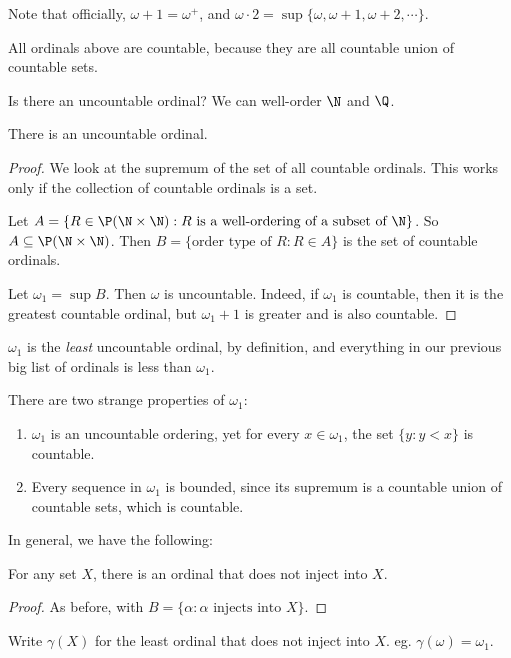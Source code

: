 \documentclass[a4paper]{article}
\begin{document}
Note that officially, $\omega + 1 = \omega^+$, and $\omega \cdot 2= \sup\{\omega, \omega + 1, \omega + 2, \cdots\}$.

All ordinals above are countable, because they are all countable union of countable sets.

Is there an uncountable ordinal? We can well-order $\N$ and $\Q$.

\begin{thm}
  There is an uncountable ordinal.
\end{thm}

\begin{proof}
  We look at the supremum of the set of all countable ordinals. This works only if the collection of countable ordinals is a set.

  Let $A = \{R\in \P(\N\times \N): R \text{ is a well-ordering of a subset of }\N\}$. So $A \subseteq \P(\N\times \N)$. Then $B = \{\text{order type of }R: R\in A\}$ is the set of countable ordinals.
  
  Let $\omega_1 = \sup B$. Then $\omega$ is uncountable. Indeed, if $\omega_1$ is countable, then it is the greatest countable ordinal, but $\omega_1 + 1$ is greater and is also countable.
\end{proof}

\note $\omega_1$ is the \emph{least} uncountable ordinal, by definition, and everything in our previous big list of ordinals is less than $\omega_1$.

There are two strange properties of $\omega_1$:
\begin{enumerate}
  \item $\omega_1$ is an uncountable ordering, yet for every $x\in \omega_1$, the set $\{y: y< x\}$ is countable.
  \item Every sequence in $\omega_1$ is bounded, since its supremum is a countable union of countable sets, which is countable.
\end{enumerate}
In general, we have the following:
\begin{thm}
  For any set $X$, there is an ordinal that does not inject into $X$.
\end{thm}

\begin{proof}
  As before, with $B = \{\alpha: \alpha\text{ injects into }X\}$.
\end{proof}

\begin{notation}
  Write $\gamma(X)$ for the least ordinal that does not inject into $X$. eg. $\gamma(\omega) = \omega_1$.
\end{notation}
\end{document}
